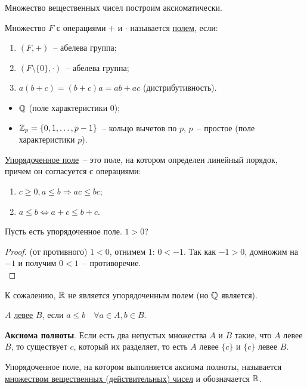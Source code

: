 Множество вещественных чисел построим аксиоматически.
\begin{defin}
	Множество $F$ с операциями $+$ и $\cdot$ называется \underline{полем}, если:
	\begin{enumerate}
		\item $(F,+)$~-- абелева группа;
		\item $(F \setminus \{0\}, \cdot)$~-- абелева группа;
		\item $a(b+c) = (b+c)a = ab+ac$ (дистрибутивность).
	\end{enumerate}
\end{defin}
\begin{ex}
	\begin{itemize}
		\item $\mathbb{Q}$ (поле характеристики $0$);
		\item $\mathbb{Z}_p = \{0,1,\dots,p-1\}$~-- кольцо вычетов по $p$, $p$~-- простое (поле характеристики $p$).
	\end{itemize}
\end{ex}

\begin{defin}
	\underline{Упорядоченное поле}~-- это поле, на котором определен линейный порядок, причем он согласуется с операциями:
	\begin{enumerate}
		\item $c \ge 0, a \le b \Rightarrow ac \le bc$;
		\item $a \le b \Leftrightarrow a+c \le b+c$.\\
	\end{enumerate}
\end{defin}

Пусть есть упорядоченное поле. $1 > 0$?
\begin{proof}
	(от противного) $1 < 0$, отнимем $1$: $0 < -1$. Так как $-1 > 0$, домножим на $-1$ и получим $0 < 1$~-- противоречие.\\
\end{proof}

К сожалению, $\mathbb{R}$ не является упорядоченным полем (но $\mathbb{Q}$ является).

\begin{defin}
	$A$ \underline{левее} $B$, если $a \le b \quad \forall a \in A, b \in B$.
\end{defin}

\label{axiom_completeness}\textbf{Аксиома полноты}. Если есть два непустых множества $A$ и $B$ такие, что $A$ левее $B$, то существует $c$, который их разделяет, то есть $A$ левее $\{c\}$ и $\{c\}$ левее $B$.
\begin{defin}
	Упорядоченное поле, на котором выполняется аксиома полноты, называется \underline{множеством вещественных (действительных) чисел} и обозначается $\mathbb{R}$.
\end{defin}